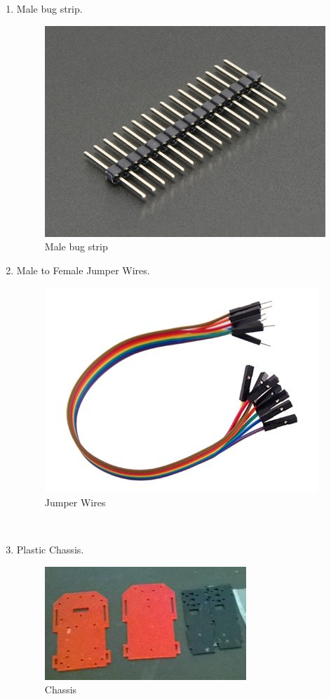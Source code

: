 \documentclass[a4paper,12pt,oneside]{book}
\begin{document}
\begin{itemize}
\begin{enumerate}
      \newpage
    \item Male bug strip.
    \begin{figure}[!h]
        \centering
        \includegraphics[scale=0.12]{mbug}
        \caption{Male bug strip}
      \end{figure}
    \item Male to Female Jumper Wires.
    \begin{figure}[!h]
        \centering
        \includegraphics[scale=0.45]{jumper}
        \caption{Jumper Wires}
      \end{figure}\\
    \item Plastic Chassis.\\
     \par
    \begin{figure}[!h]
        \centering
        \includegraphics[scale=0.75]{chasis}
        \caption{Chassis}
      \end{figure}
      \newpage
  \end{enumerate}

\end{itemize}
\newpage
\end{document}
